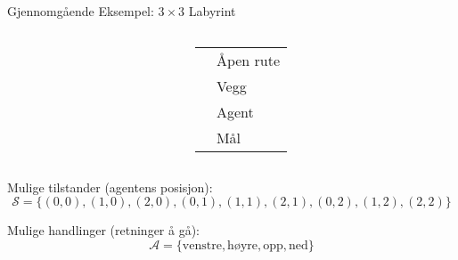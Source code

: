 \documentclass[UKenglish]{beamer}
\begin{document}
\begin{frame}{Gjennomgående Eksempel: $3\times3$ Labyrint}
	
	\begin{columns}
		\begin{column}{0.5\textwidth}
			\begin{center}
			
			\end{center}
		\end{column}
		\begin{column}{0.5\textwidth}%
			\begin{table}[!hbt]
				\centering
				\begin{tabular}{m{1cm} m{2cm}}
				 & Åpen rute\\
				 &  Vegg \\ 
				 & Agent\\
				 & Mål\\
				\end{tabular}
			\end{table}
		\end{column}
	\end{columns}
	
	\vspace{1em}
	
	\pause
	
	Mulige tilstander (agentens posisjon):
	$$\mathcal{S} =\lbrace (0,0), (1,0), (2,0), (0,1), (1,1), (2,1), (0,2), (1,2), (2,2)\rbrace$$
	
	\pause
	
	Mulige handlinger (retninger å gå):
	$$\mathcal{A} = \{\text{venstre}, \text{høyre}, \text{opp}, \text{ned}\}$$
\end{frame}
\end{document}
